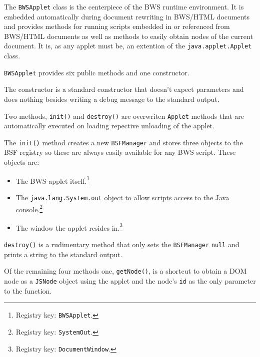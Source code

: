 The \texttt{BWSApplet} class is the centerpiece of the BWS runtime environment. It is embedded automatically during document rewriting in BWS/HTML documents and provides methods for running scripts embedded in or referenced from BWS/HTML documents as well as methods to easily obtain nodes of the current document. It is, as any applet must be, an extention of the \texttt{java.applet.Applet} class.

\texttt{BWSApplet} provides six public methods and one constructor. 

The constructor is a standard constructor that doesn't expect parameters and does nothing besides writing a debug message to the standard output.

Two methods, \texttt{init()} and \texttt{destroy()} are overwriten \texttt{Applet} methods that are automatically executed on loading repective unloading of the applet. 

The \texttt{init()} method creates a new \texttt{BSFManager} and stores three objects to the BSF registry so these are always easily available for any BWS script. These objects are:

\begin{itemize}
	\item The BWS applet itself.\footnote{Registry key: \texttt{BWSApplet}.}
	\item The \texttt{java.lang.System.out} object to allow scripts access to the Java console.\footnote{Registry key: \texttt{SystemOut}.}
	\item The window the applet resides in.\footnote{Registry key: \texttt{DocumentWindow}.}
\end{itemize}

\texttt{destroy()} is a rudimentary method that only sets the \texttt{BSFManager} \texttt{null} and prints a string to the standard output.

Of the remaining four methods one, \texttt{getNode()}, is a shortcut to obtain a DOM node as a \texttt{JSNode} object using the applet and the node's \texttt{id} as the only parameter to the function.

